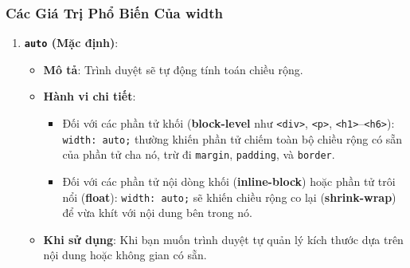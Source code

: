 \documentclass[11pt,oneside]{book}
\newcommand{\codeinline}[1]{\textcolor{accentOrange}{\texttt{#1}}}
\newcommand{\term}[1]{\textbf{\textcolor{primaryBlue}{#1}}}
\begin{document}
\subsubsection{Các Giá Trị Phổ Biến Của width}

\begin{enumerate}[leftmargin=1.5em, itemsep=6pt, parsep=0pt]
    \item \textbf{\codeinline{auto} (Mặc định)}:
    \begin{itemize}[leftmargin=1.2em, itemsep=3pt, parsep=0pt]
        \item \textbf{Mô tả}: Trình duyệt sẽ tự động tính toán chiều rộng.
        \item \textbf{Hành vi chi tiết}:
        \begin{itemize}[leftmargin=1.2em, itemsep=2pt, parsep=0pt]
            \item Đối với các phần tử khối (\term{block-level} như \codeinline{<div>}, \codeinline{<p>}, \codeinline{<h1>}--\codeinline{<h6>}): \codeinline{width: auto;} thường khiến phần tử chiếm toàn bộ chiều rộng có sẵn của phần tử cha nó, trừ đi \codeinline{margin}, \codeinline{padding}, và \codeinline{border}.
            \item Đối với các phần tử nội dòng khối (\term{inline-block}) hoặc phần tử trôi nổi (\term{float}): \codeinline{width: auto;} sẽ khiến chiều rộng co lại (\term{shrink-wrap}) để vừa khít với nội dung bên trong nó.
        \end{itemize}
        \item \textbf{Khi sử dụng}: Khi bạn muốn trình duyệt tự quản lý kích thước dựa trên nội dung hoặc không gian có sẵn.
    \end{itemize}


\end{enumerate}
\end{document}
